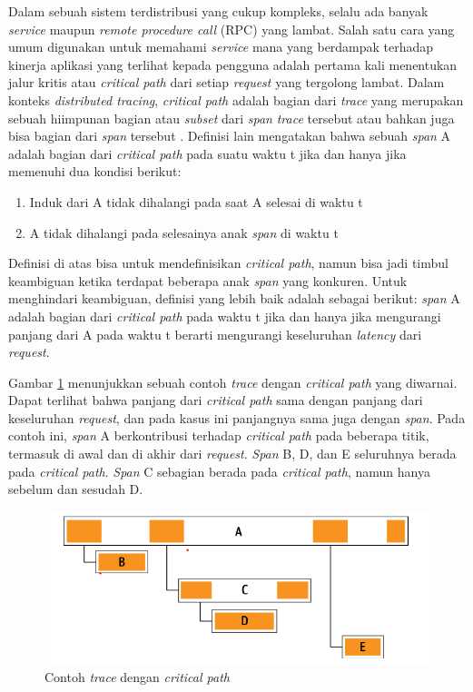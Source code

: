 Dalam sebuah sistem terdistribusi yang cukup kompleks, selalu ada banyak \textit{service} maupun \textit{remote procedure call} (RPC) yang lambat. Salah satu cara yang umum digunakan untuk memahami \textit{service} mana yang berdampak terhadap kinerja aplikasi yang terlihat kepada pengguna adalah pertama kali menentukan jalur kritis atau \textit{critical path} dari setiap \textit{request} yang tergolong lambat. Dalam konteks \textit{distributed tracing}, \textit{critical path} adalah bagian dari \textit{trace} yang merupakan sebuah hiimpunan bagian atau \textit{subset} dari \textit{span} \textit{trace} tersebut atau bahkan juga bisa bagian dari \textit{span} tersebut \cite{parker2020distributed}. Definisi lain mengatakan bahwa sebuah \textit{span} A adalah bagian dari \textit{critical path} pada suatu waktu t jika dan hanya jika memenuhi dua kondisi berikut:
\begin{enumerate}
	\item Induk dari A tidak dihalangi pada saat A selesai di waktu t
	\item A tidak dihalangi pada selesainya anak \textit{span} di waktu t
\end{enumerate}

Definisi di atas bisa untuk mendefinisikan \textit{critical path}, namun bisa jadi timbul keambiguan ketika terdapat beberapa anak \textit{span} yang konkuren. Untuk menghindari keambiguan, definisi yang lebih baik adalah sebagai berikut: \textit{span} A adalah bagian dari \textit{critical path} pada waktu t jika dan hanya jika mengurangi panjang dari A pada waktu t berarti mengurangi keseluruhan \textit{latency} dari \textit{request}.

Gambar \ref{ch2-cp-1} menunjukkan sebuah contoh \textit{trace} dengan \textit{critical path} yang diwarnai. Dapat terlihat bahwa panjang dari \textit{critical path} sama dengan panjang dari keseluruhan \textit{request}, dan pada kasus ini panjangnya sama juga dengan \textit{span}. Pada contoh ini, \textit{span} A berkontribusi terhadap \textit{critical path} pada beberapa titik, termasuk di awal dan di akhir dari \textit{request}. \textit{Span} B, D, dan E seluruhnya berada pada \textit{critical path}. \textit{Span} C sebagian berada pada \textit{critical path}, namun hanya sebelum dan sesudah D.
\begin{figure}[htb]
	\centering
	\includegraphics[width=1\textwidth]{resources/ch2/cp-1.png}
	\caption{Contoh \textit{trace} dengan \textit{critical path} \citep{parker2020distributed}}
	\label{ch2-cp-1}
\end{figure}

